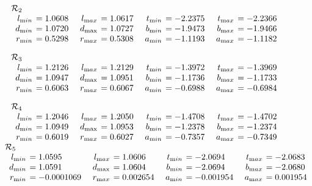 \begin{table}
\begin{small}
$$\begin{array}{rlrlrlrl}\noalign{\noindent  $\mathcal {R}_2$}
\noalign{\vskip2pt}
l_{\textrm min} &\hskip-6pt =  1.0608&\enspace    l_{\textrm max} &\hskip-6pt = 1.0617&\enspace   
t_{\textrm min} &\hskip-6pt =  -2.2375&\enspace    t_{\textrm max} &\hskip-6pt = -2.2366\\
d_{\textrm min} &\hskip-6pt =  1.0720&  d_\mathrm {max}&\hskip-6pt  = 1.0727&   b_{\textrm min} &\hskip-6pt =  -1.9473&  b_{\textrm max} &\hskip-6pt = -1.9466\\
r_{\textrm min} &\hskip-6pt =  0.5298& 
r_{\textrm max} &\hskip-6pt = 0.5308&   a_{\textrm min} &\hskip-6pt =  -1.1193&  a_{\textrm max} &\hskip-6pt = -1.1182\end{array}$$

$$\begin{array}{rlrlrlrl}
\noalign{\noindent  $\mathcal {R}_3$}
\noalign{\vskip2pt}
l_{\textrm min} &\hskip-6pt =  1.2126&\enspace    l_{\textrm max} &\hskip-6pt = 1.2129&\enspace   
t_{\textrm min} &\hskip-6pt =  -1.3972&\enspace    t_{\textrm max}&\hskip-6pt  = -1.3969\\
d_{\textrm min} &\hskip-6pt =  1.0947&  d_\mathrm {max}&\hskip-6pt  = 1.0951&   b_{\textrm min} &\hskip-6pt =  -1.1736&  b_{\textrm max}&\hskip-6pt  = -1.1733\\
r_{\textrm min} &\hskip-6pt =  0.6063& 
r_{\textrm max}&\hskip-6pt  = 0.6067&   a_{\textrm min} &\hskip-6pt =  -0.6988&  a_{\textrm max}&\hskip-6pt  = -0.6984\end{array}
$$

$$\begin{array}{rlrlrlrl}
\noalign{\noindent  $\mathcal {R}_4$}
\noalign{\vskip2pt}
l_{\textrm min} &\hskip-6pt =  1.2046&\enspace    l_{\textrm max}&\hskip-6pt  = 1.2050&\enspace   
t_{\textrm min} &\hskip-6pt =  -1.4708&\enspace    t_{\textrm max}&\hskip-6pt = -1.4702\\
d_{\textrm min} &\hskip-6pt =  1.0949&  d_\mathrm {max}&\hskip-6pt  = 1.0953&   b_{\textrm min} &\hskip-6pt =  -1.2378&  b_{\textrm max} &\hskip-6pt = -1.2374\\
r_{\textrm min} &\hskip-6pt =  0.6019& 
r_{\textrm max} &\hskip-6pt = 0.6027&   a_{\textrm min} &\hskip-6pt =  -0.7357&  a_{\textrm max} &\hskip-6pt = -0.7349\end{array}$$

$$\begin{array}{rlrlrlrl}
\noalign{\vskip-10pt}
\noalign{\noindent  $\mathcal {R}_5$}
\noalign{\vskip2pt}
l_{\textrm min} &\hskip-6pt =  1.0595&\enspace    l_{\textrm max}&\hskip-6pt = 1.0606&\enspace   
t_{\textrm min}&\hskip-6pt =  -2.0694&\enspace   t_{\textrm max} &\hskip-6pt = -2.0683\\
d_{\textrm min} &\hskip-6pt =  1.0591&  d_\mathrm {max}&\hskip-6pt  = 1.0604&   b_{\textrm min} &\hskip-6pt =  -2.0694&  b_{\textrm max}&\hskip-6pt  = -2.0680\\
r_{\textrm min} &\hskip-6pt =  -0.0001069&  r_{\textrm max} &\hskip-6pt =  0.002654&  a_{\textrm min} &\hskip-6pt =  -0.001954&  a_{\textrm max}
&\hskip-6pt =  0.001954\end{array}$$


\end{small}
\end{table}
